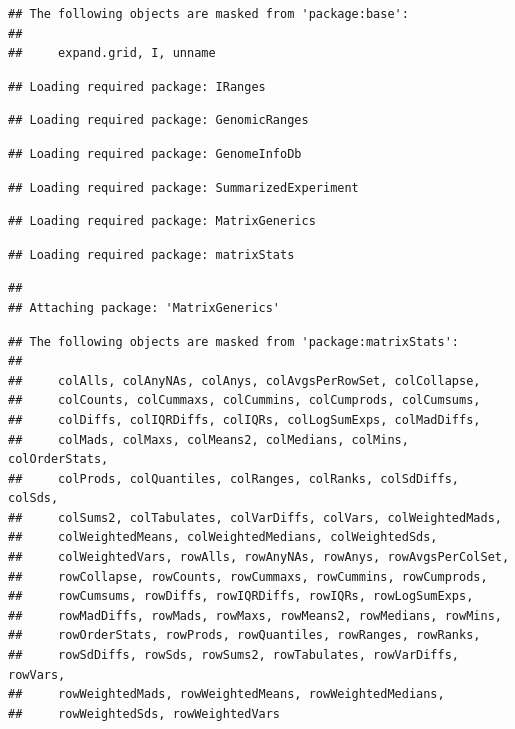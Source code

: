 \documentclass[
]{article}
\begin{document}
\begin{verbatim}
## The following objects are masked from 'package:base':
## 
##     expand.grid, I, unname
\end{verbatim}

\begin{verbatim}
## Loading required package: IRanges
\end{verbatim}

\begin{verbatim}
## Loading required package: GenomicRanges
\end{verbatim}

\begin{verbatim}
## Loading required package: GenomeInfoDb
\end{verbatim}

\begin{verbatim}
## Loading required package: SummarizedExperiment
\end{verbatim}

\begin{verbatim}
## Loading required package: MatrixGenerics
\end{verbatim}

\begin{verbatim}
## Loading required package: matrixStats
\end{verbatim}

\begin{verbatim}
## 
## Attaching package: 'MatrixGenerics'
\end{verbatim}

\begin{verbatim}
## The following objects are masked from 'package:matrixStats':
## 
##     colAlls, colAnyNAs, colAnys, colAvgsPerRowSet, colCollapse,
##     colCounts, colCummaxs, colCummins, colCumprods, colCumsums,
##     colDiffs, colIQRDiffs, colIQRs, colLogSumExps, colMadDiffs,
##     colMads, colMaxs, colMeans2, colMedians, colMins, colOrderStats,
##     colProds, colQuantiles, colRanges, colRanks, colSdDiffs, colSds,
##     colSums2, colTabulates, colVarDiffs, colVars, colWeightedMads,
##     colWeightedMeans, colWeightedMedians, colWeightedSds,
##     colWeightedVars, rowAlls, rowAnyNAs, rowAnys, rowAvgsPerColSet,
##     rowCollapse, rowCounts, rowCummaxs, rowCummins, rowCumprods,
##     rowCumsums, rowDiffs, rowIQRDiffs, rowIQRs, rowLogSumExps,
##     rowMadDiffs, rowMads, rowMaxs, rowMeans2, rowMedians, rowMins,
##     rowOrderStats, rowProds, rowQuantiles, rowRanges, rowRanks,
##     rowSdDiffs, rowSds, rowSums2, rowTabulates, rowVarDiffs, rowVars,
##     rowWeightedMads, rowWeightedMeans, rowWeightedMedians,
##     rowWeightedSds, rowWeightedVars
\end{verbatim}
\end{document}
